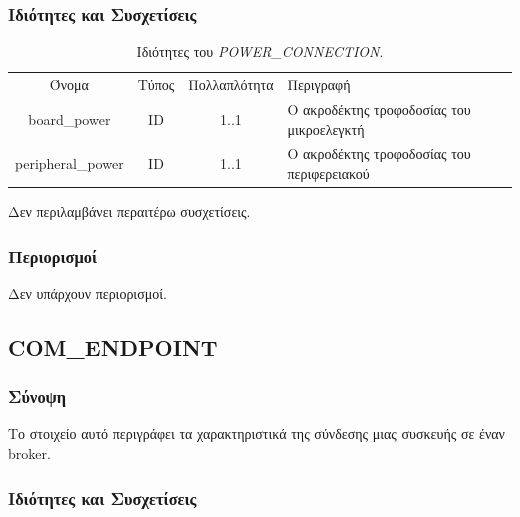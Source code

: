 \subsubsection*{Ιδιότητες και Συσχετίσεις}

\begin{table}[H]
	\begin{center}
		\begin{tabular}{ | c | c | c| m{5.5cm} | }
			\hline
			\rowcolor{Gray}
			\multicolumn{4}{|c|}{\textbf{Ιδιότητες}}\\
			\hline
			\rowcolor{Gray}
			Όνομα & Τύπος & Πολλαπλότητα & Περιγραφή \\
			\hline
			board\_power & ID & 1..1 & Ο ακροδέκτης τροφοδοσίας του μικροελεγκτή \\
			\hline
			peripheral\_power & ID & 1..1 & Ο ακροδέκτης τροφοδοσίας του περιφερειακού \\
			\hline
		\end{tabular}
		\caption{Ιδιότητες του \textit{POWER\_CONNECTION}.}
		\label{tab:power_connection}
	\end{center}
\end{table}

\noindent Δεν περιλαμβάνει περαιτέρω συσχετίσεις.

\subsubsection*{Περιορισμοί}

\noindent Δεν υπάρχουν περιορισμοί.

\subsection{COM\_ENDPOINT}
\label{subsec:com_endpoint}

\subsubsection*{Σύνοψη}

\noindent Το στοιχείο αυτό περιγράφει τα χαρακτηριστικά της σύνδεσης μιας συσκευής σε έναν broker.

\subsubsection*{Ιδιότητες και Συσχετίσεις}

